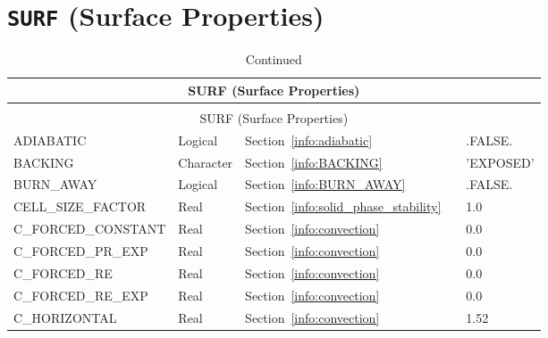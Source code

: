 \documentclass[11pt]{book}
\begin{document}
\vspace{\baselineskip}


\section{\texorpdfstring{{\tt SURF}}{SURF} (Surface Properties)}

\begin{longtable}{@{\extracolsep{\fill}}|l|l|l|l|l|}
\caption[Surface properties ({\ct SURF} namelist group)]{For more information see Section~\ref{info:SURF}.}
\label{tbl:SURF} \\
\hline
\multicolumn{5}{|c|}{{\ct SURF} (Surface Properties)} \\
\hline \hline
\endfirsthead
\caption[]{Continued} \\
\hline
\multicolumn{5}{|c|}{{\ct SURF} (Surface Properties)} \\
\hline \hline
\endhead
{\ct ADIABATIC}                       & Logical         & Section~\ref{info:adiabatic}              &                     & {\ct .FALSE.}           \\ \hline
{\ct BACKING}                         & Character       & Section~\ref{info:BACKING}                &                     & {\ct 'EXPOSED'}         \\ \hline
{\ct BURN\_AWAY}                      & Logical         & Section~\ref{info:BURN_AWAY}              &                     & {\ct .FALSE.}           \\ \hline
{\ct CELL\_SIZE\_FACTOR}              & Real            & Section~\ref{info:solid_phase_stability}  &                     & 1.0                     \\ \hline
{\ct C\_FORCED\_CONSTANT}             & Real            & Section~\ref{info:convection}             &                     & 0.0                     \\ \hline
{\ct C\_FORCED\_PR\_EXP}              & Real            & Section~\ref{info:convection}             &                     & 0.0                     \\ \hline
{\ct C\_FORCED\_RE}                   & Real            & Section~\ref{info:convection}             &                     & 0.0                     \\ \hline
{\ct C\_FORCED\_RE\_EXP}              & Real            & Section~\ref{info:convection}             &                     & 0.0                     \\ \hline
{\ct C\_HORIZONTAL}                   & Real            & Section~\ref{info:convection}             &                     & 1.52                    \\ \hline

\end{longtable}
\end{document}
